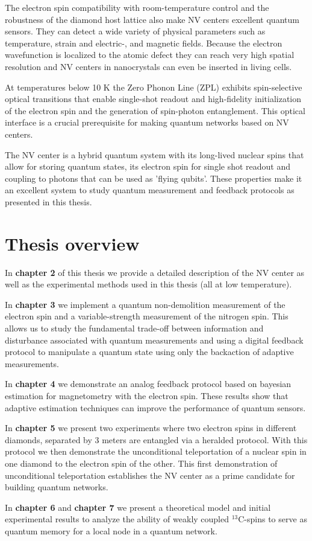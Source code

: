 The electron spin compatibility with room-temperature control and the robustness of the diamond host lattice also make NV centers excellent quantum sensors. They can detect a wide variety of physical parameters such as temperature, strain and electric-, and magnetic fields. Because the electron wavefunction is localized to the atomic defect they can reach very high spatial resolution and NV centers in nanocrystals can even be inserted in living cells.

At temperatures below 10 K the Zero Phonon Line (ZPL) exhibits spin-selective optical transitions that enable single-shot readout and high-fidelity initialization of the electron spin and the generation of spin-photon entanglement. This optical interface is a crucial prerequisite for making quantum networks based on NV centers.

The NV center is a hybrid quantum system with its long-lived nuclear spins that allow for storing quantum states, its electron spin for single shot readout and coupling to photons that can be used as 'flying qubits'. These properties make it an excellent system to study quantum measurement and feedback protocols as presented in this thesis.

\section{Thesis overview}

In \textbf{chapter 2} of this thesis we provide a detailed description of the NV center as well as the experimental methods used in this thesis (all at low temperature).

In \textbf{chapter 3} we implement a quantum non-demolition measurement of the electron spin and a variable-strength measurement of the nitrogen spin. This allows us to study the fundamental trade-off between information and disturbance associated with quantum measurements and using a digital feedback protocol to manipulate a quantum state using only the backaction of adaptive measurements.

In \textbf{chapter 4} we demonstrate an analog feedback protocol based on bayesian estimation for magnetometry with the electron spin. These results show that adaptive estimation techniques can improve the performance of quantum sensors.

In \textbf{chapter 5} we present two experiments where two electron spins in different diamonds, separated by 3 meters are entangled via a heralded protocol. With this protocol we then demonstrate the unconditional teleportation of a nuclear spin in one diamond to the electron spin of the other. This first demonstration of unconditional teleportation establishes the NV center as a prime candidate for building quantum networks.

In \textbf{chapter 6} and \textbf{chapter 7} we present a theoretical model and initial experimental results to analyze the ability of weakly coupled $^{13}$C-spins to serve as quantum memory for a local node in a quantum network.

\clearpage




